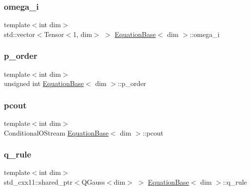 \subsubsection{\texorpdfstring{omega\+\_\+i}{omega\_i}}
{\footnotesize\ttfamily template$<$int dim$>$ \\
std\+::vector$<$Tensor$<$1, dim$>$ $>$ \hyperlink{class_equation_base}{Equation\+Base}$<$ dim $>$\+::omega\+\_\+i\hspace{0.3cm}{\ttfamily [protected]}}

\mbox{\label{class_equation_base_a0facd1cc5977e32b301a134ed5b9fa98}} 
\subsubsection{\texorpdfstring{p\+\_\+order}{p\_order}}
{\footnotesize\ttfamily template$<$int dim$>$ \\
unsigned int \hyperlink{class_equation_base}{Equation\+Base}$<$ dim $>$\+::p\+\_\+order\hspace{0.3cm}{\ttfamily [protected]}}

\mbox{\label{class_equation_base_a12dd28de05c41d4dd3ec30e7195bfa97}} 
\subsubsection{\texorpdfstring{pcout}{pcout}}
{\footnotesize\ttfamily template$<$int dim$>$ \\
Conditional\+O\+Stream \hyperlink{class_equation_base}{Equation\+Base}$<$ dim $>$\+::pcout\hspace{0.3cm}{\ttfamily [protected]}}

\mbox{\label{class_equation_base_a5e677b436f1abeeeffc3da284e5c1c4c}} 
\subsubsection{\texorpdfstring{q\+\_\+rule}{q\_rule}}
{\footnotesize\ttfamily template$<$int dim$>$ \\
std\+\_\+cxx11\+::shared\+\_\+ptr$<$Q\+Gauss$<$dim$>$ $>$ \hyperlink{class_equation_base}{Equation\+Base}$<$ dim $>$\+::q\+\_\+rule\hspace{0.3cm}{\ttfamily [protected]}}

